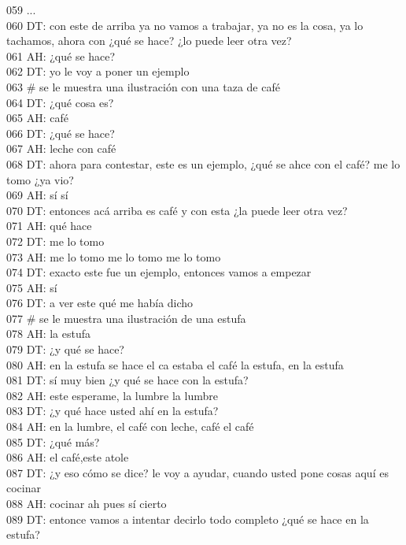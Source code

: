 059 ...\\
060 DT: con este de arriba ya no vamos a trabajar, ya no es la cosa, ya lo tachamos, ahora con ¿qué se hace? ¿lo puede leer otra vez?\\
061 AH: ¿qué se hace?\\
062 DT: yo le voy a poner un ejemplo\\
063 \# se le muestra una ilustración con una taza de café\\
064 DT: ¿qué cosa es?\\
065 AH: café\\
066 DT: ¿qué se hace?\\
067 AH: leche con café\\
068 DT: ahora para contestar, este es un ejemplo, ¿qué se ahce con el café? me lo tomo ¿ya vio?\\
069 AH: sí sí\\
070 DT: entonces acá arriba es café y con esta ¿la puede leer otra vez?\\
071 AH: qué hace\\
072 DT: me lo tomo\\
073 AH: me lo tomo me lo tomo me lo tomo\\
074 DT: exacto este fue un ejemplo, entonces vamos a empezar\\
075 AH: sí\\
076 DT: a ver este qué me había dicho\\
077 \# se le muestra una ilustración de una estufa\\
078 AH: la estufa\\
079 DT: ¿y qué se hace?\\
080 AH: en la estufa se hace el ca estaba el café la estufa, en la estufa\\
081 DT: sí muy bien ¿y qué se hace con la estufa?\\
082 AH: este esperame, la lumbre la lumbre\\
083 DT: ¿y qué hace usted ahí en la estufa?\\
084 AH: en la lumbre, el café con leche, café el café\\
085 DT: ¿qué más?\\
086 AH: el café,este atole\\
087 DT: ¿y eso cómo se dice? le voy a ayudar, cuando usted pone cosas aquí es cocinar\\
088 AH: cocinar ah pues sí cierto\\
089 DT: entonce vamos a intentar decirlo todo completo ¿qué se hace en la estufa?\\
